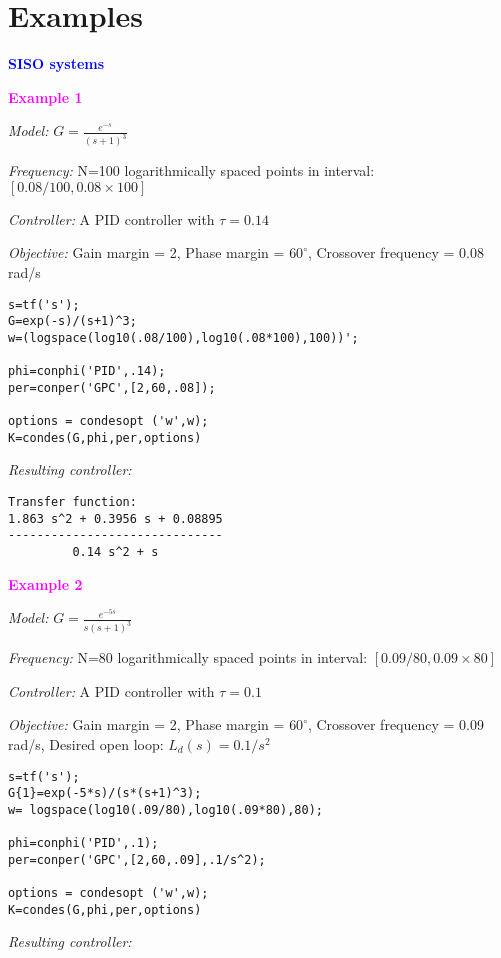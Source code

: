 \documentclass [12pt , a4paper] {article}
\begin{document}
\section{Examples}

\textcolor{blue}{\textbf{SISO systems}}

\textcolor{magenta}{\textbf{Example 1}}

\emph{Model:} $G=\frac{e^{-s}}{(s+1)^3}$

\emph{Frequency:} N=100 logarithmically spaced points in interval: $[0.08/100,0.08\times100]$

\emph{Controller:} A PID controller with $\tau=0.14$

\emph{Objective:} Gain margin = 2, Phase margin = $60^{\circ}$, Crossover frequency = 0.08 rad/s 

\begin{lstlisting}
s=tf('s');
G=exp(-s)/(s+1)^3;
w=(logspace(log10(.08/100),log10(.08*100),100))';

phi=conphi('PID',.14);
per=conper('GPC',[2,60,.08]);

options = condesopt ('w',w);
K=condes(G,phi,per,options)
\end{lstlisting}

\emph{Resulting controller:}

\begin{lstlisting}
Transfer function:
1.863 s^2 + 0.3956 s + 0.08895
------------------------------
         0.14 s^2 + s
\end{lstlisting}

\textcolor{magenta}{\textbf{Example 2}}

\emph{Model:} $G=\frac{e^{-5s}}{s(s+1)^3}$

\emph{Frequency:} N=80 logarithmically spaced points in interval: $[0.09/80,0.09\times80]$

\emph{Controller:} A PID controller with $\tau=0.1$

\emph{Objective:} Gain margin = 2, Phase margin = $60^{\circ}$, Crossover frequency = 0.09 rad/s, Desired open loop: $L_d(s)=0.1/s^2$ 

\begin{lstlisting}
s=tf('s');
G{1}=exp(-5*s)/(s*(s+1)^3);
w= logspace(log10(.09/80),log10(.09*80),80);

phi=conphi('PID',.1);
per=conper('GPC',[2,60,.09],.1/s^2);

options = condesopt ('w',w);
K=condes(G,phi,per,options)
\end{lstlisting}

\emph{Resulting controller:}
\end{document}
